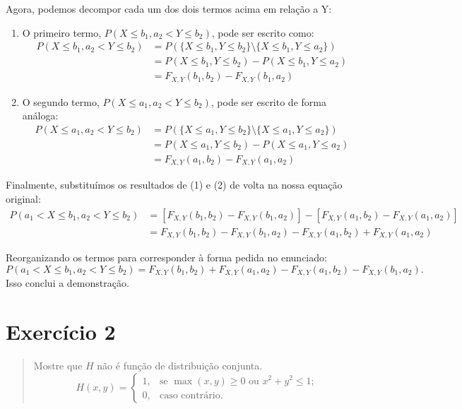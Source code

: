 \documentclass[12pt]{article}
\begin{document}
Agora, podemos decompor cada um dos dois termos acima em relação a Y:
\begin{enumerate}
    \item O primeiro termo, $P(X \le b_1, a_2 < Y \le b_2)$, pode ser escrito como:
    \begin{align*}
    P(X \le b_1, a_2 < Y \le b_2) &= P(\{X \le b_1, Y \le b_2\} \setminus \{X \le b_1, Y \le a_2\}) \\
    &= P(X \le b_1, Y \le b_2) - P(X \le b_1, Y \le a_2) \\
    &= F_{X,Y}(b_1, b_2) - F_{X,Y}(b_1, a_2)
    \end{align*}

    \item O segundo termo, $P(X \le a_1, a_2 < Y \le b_2)$, pode ser escrito de forma análoga:
    \begin{align*}
    P(X \le a_1, a_2 < Y \le b_2) &= P(\{X \le a_1, Y \le b_2\} \setminus \{X \le a_1, Y \le a_2\}) \\
    &= P(X \le a_1, Y \le b_2) - P(X \le a_1, Y \le a_2) \\
    &= F_{X,Y}(a_1, b_2) - F_{X,Y}(a_1, a_2)
    \end{align*}
\end{enumerate}

Finalmente, substituímos os resultados de (1) e (2) de volta na nossa equação original:
\begin{align*}
P(a_1 < X \le b_1, a_2 < Y \le b_2) &= \left[ F_{X,Y}(b_1, b_2) - F_{X,Y}(b_1, a_2) \right] - \left[ F_{X,Y}(a_1, b_2) - F_{X,Y}(a_1, a_2) \right] \\
&= F_{X,Y}(b_1, b_2) - F_{X,Y}(b_1, a_2) - F_{X,Y}(a_1, b_2) + F_{X,Y}(a_1, a_2)
\end{align*}

Reorganizando os termos para corresponder à forma pedida no enunciado:
\[ P(a_1 < X \le b_1, a_2 < Y \le b_2) = F_{X,Y}(b_1, b_2) + F_{X,Y}(a_1, a_2) - F_{X,Y}(a_1, b_2) - F_{X,Y}(b_1, a_2). \]
Isso conclui a demonstração. \hfill \qedsymbol

\section{Exercício 2}

\begin{quote}
Mostre que $H$ não é função de distribuição conjunta.
\[ H(x,y) = \begin{cases} 1, & \text{se } \max(x,y) \ge 0 \text{ ou } x^2+y^2 \le 1; \\ 0, & \text{caso contrário.} \end{cases} \]
\end{quote}
\end{document}
